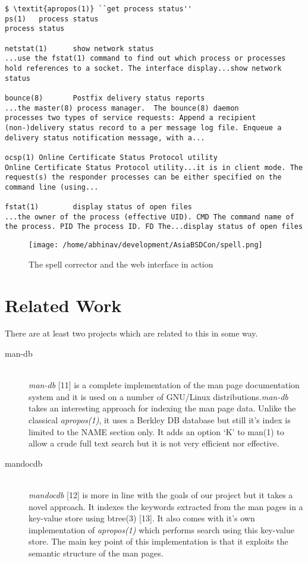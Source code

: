 \documentclass[titlepage, a4paper, 12pt]{article}
\begin{document}
\begin{lstlisting}
$ \textit{apropos(1)} ``get process status''
ps(1)   process status
process status

netstat(1)      show network status
...use the fstat(1) command to find out which process or processes
hold references to a socket. The interface display...show network
status

bounce(8)       Postfix delivery status reports
...the master(8) process manager.  The bounce(8) daemon
processes two types of service requests: Append a recipient
(non-)delivery status record to a per message log file. Enqueue a
delivery status notification message, with a...

ocsp(1) Online Certificate Status Protocol utility
Online Certificate Status Protocol utility...it is in client mode. The
request(s) the responder processes can be either specified on the
command line (using...

fstat(1)        display status of open files
...the owner of the process (effective UID). CMD The command name of
the process. PID The process ID. FD The...display status of open files
\end{lstlisting}

\begin{figure}[htp]
\texttt{[image: /home/abhinav/development/AsiaBSDCon/spell.png]}
\caption{The spell corrector and the web interface in action}
\label{}
\end{figure}
\section{Related Work}
There are at least two projects which are related to this in some way.
\begin{description}
\item[man-db] \hfill \\
\textit{man-db} [11] is a complete implementation of the man page documentation
system and it is used on a number of GNU/Linux distributions.\textit{man-db}
takes an interesting approach for indexing the man page data. Unlike the
classical \textit{apropos(1)}, it uses a Berkley DB database but still it's index
is limited to the NAME section only. It adds an option `K' to man(1) to allow a
crude full text search but it is not very efficient nor effective.
\end{description}
\begin{description}
\item[mandocdb] \hfill \\
\textit{mandocdb} [12] is more in line with the goals of our project but it takes
a novel approach. It indexes the keywords extracted from the man pages in a
key-value store using btree(3) [13]. It also comes with it's own implementation
of \textit{apropos(1)} which performs search using this key-value store. The
main key point of this implementation is that it exploits the semantic structure
of the man pages. 
\end{description}
\end{document}
